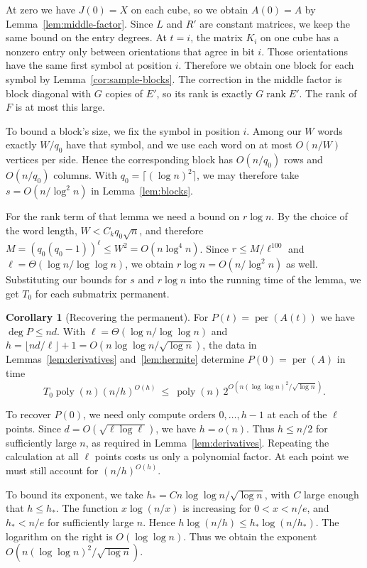 \documentclass{article}
\theoremstyle{definition}
\newtheorem{corollary}[theorem]{Corollary}
\DeclareMathOperator{\per}{per}
\DeclareMathOperator{\rank}{rank}
\begin{document}
At zero we have \(J(0)=X\) on each cube, so we obtain \(A(0)=A\)
by Lemma~\ref{lem:middle-factor}. Since \(L\) and \(R'\) are constant
matrices, we keep the same bound on the entry degrees. At \(t=i\), the matrix \(K_i\) on one cube has a
nonzero entry only between orientations that agree in bit \(i\).
Those orientations have the same first symbol at position \(i\).
Therefore we obtain one block for each symbol by Lemma~\ref{cor:sample-blocks}.
The correction in the middle factor is block diagonal with \(G\)
copies of \(E'\), so its rank is exactly \(G\rank E'\). The rank of
\(F\) is at most this large.

To bound a block's size, we fix the symbol in position \(i\). Among our
\(W\) words exactly \(W/q_0\) have that symbol, and we use each word
on at most \(O(n/W)\) vertices per side. Hence the corresponding block has \(O(n/q_0)\) rows and
\(O(n/q_0)\) columns. With \(q_0=\lceil(\log n)^2\rceil\), we may therefore take
\(s=O(n/\log^2 n)\) in Lemma~\ref{lem:blocks}.

For the rank term of that lemma we need a bound on \(r\log n\).
By the choice of the word length, \(W<C_kq_0\sqrt n\), and therefore
\(M=(q_0(q_0-1))^\ell\le W^2=O(n\log^4 n)\). Since
\(r\le M/\ell^{100}\) and \(\ell=\Theta(\log n/\log\log n)\), we
obtain \(r\log n=O(n/\log^2 n)\) as well. Substituting our bounds for
\(s\) and \(r\log n\) into the running time of the lemma, we get
\(T_0\) for each submatrix permanent.

\begin{corollary}[Recovering the permanent]\label{cor:recover}
For \(P(t)=\per(A(t))\) we have \(\deg P\le nd\).
With \(\ell=\Theta(\log n/\log\log n)\) and
\(h=\lfloor nd/\ell\rfloor+1=O(n\log\log n/\sqrt{\log n})\),
the data in Lemmas~\ref{lem:derivatives} and~\ref{lem:hermite} determine
\(P(0)=\per(A)\) in time
\[
    T_0\operatorname{poly}(n)(n/h)^{O(h)}
    \ \le\ \operatorname{poly}(n)\,
          2^{O\left(n(\log\log n)^2/\sqrt{\log n}\right)}.
\]
\end{corollary}

To recover \(P(0)\), we need only compute orders \(0,\ldots,h-1\)
at each of the \(\ell\) points. Since \(d=O(\sqrt{\ell\log\ell})\), we have
\(h=o(n)\). Thus \(h\le n/2\) for sufficiently large \(n\), as required
in Lemma~\ref{lem:derivatives}. Repeating the calculation at all
\(\ell\) points costs us only a polynomial factor. At each point we
must still account for \((n/h)^{O(h)}\).

To bound its exponent, we take \(h_*=Cn\log\log n/\sqrt{\log n}\), with
\(C\) large enough that \(h\le h_*\). The function \(x\log(n/x)\) is
increasing for \(0<x<n/e\), and \(h_*<n/e\) for sufficiently large
\(n\). Hence \(h\log(n/h)\le h_*\log(n/h_*)\). The logarithm on the
right is \(O(\log\log n)\). Thus we obtain the exponent
\(O(n(\log\log n)^2/\sqrt{\log n})\).
\end{document}
